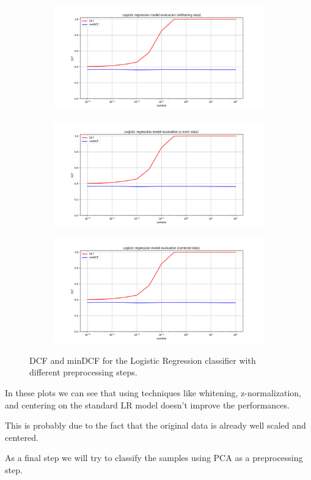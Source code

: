 \documentclass[12pt]{report}
\newcommand{\nnl}{%
    \newline
    \newline
}
\newcommand{\nl}{%
    \newline
    \noindent
}
\begin{document}
\begin{figure}[H]
    \centering
    \begin{subfigure}[t]{0.32\textwidth}
        \includegraphics[width=\textwidth]{./plot/LR/log_reg_withening.png}
    \end{subfigure}
    \hfill
    \begin{subfigure}[t]{0.32\textwidth}
        \includegraphics[width=\textwidth]{./plot/LR/log_reg_znorm.png}
    \end{subfigure}
    \hfill
    \begin{subfigure}[t]{0.32\textwidth}
        \includegraphics[width=\textwidth]{./plot/LR/log_reg_centered.png}
    \end{subfigure}
    \caption{DCF and minDCF for the Logistic Regression classifier with different preprocessing steps.}
    \label{fig:log_reg_preprocessing}
\end{figure}
\noindent
In these plots we can see that using techniques like whitening, z-normalization, and centering on the standard LR model doesn't improve the performances.
\nl
This is probably due to the fact that the original data is already well scaled and centered.
\nnl
As a final step we will try to classify the samples using PCA as a preprocessing step.
\end{document}
